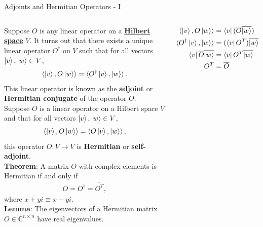 \documentclass{beamer}
\begin{document}
\begin{frame}{Adjoints and Hermitian Operators - I}
  {\tiny
    \begin{columns}
    Suppose $O$ is any linear operator on a 
    \href{https://mathworld.wolfram.com/HilbertSpace.html}{\textbf{Hilbert space}} $V$.
    It turns out that there exists a unique linear operator $O^{\dagger}$ on $V$ such that for all vectors $\ket{v}, \ket{w} \in V$,
    \begin{align*}
      \braket{\ket{v}, O\ket{w}} = \braket{O^{\dagger} \ket{v}, \ket{w}}.
    \end{align*}
    This linear operator is known as the \textbf{adjoint} or \textbf{Hermitian conjugate} of the operator $O$. \\

    \vspace{0.3cm}
    Suppose $O$ is a linear operator on a Hilbert space $V$ and that for all vectors $\ket{v}, \ket{w} \in V$,
    \begin{align*}
      \braket{\ket{v}, O\ket{w}} = \braket{O \ket{v}, \ket{w}},
    \end{align*}
    this operator $O: V \rightarrow V$ is \textbf{Hermitian} or \textbf{self-adjoint}. \\

    \vspace{0.3cm}
    \textbf{Theorem}\cite{thespectraltheoremforhermitianmatrice}: A matrix $O$ with complex elements is Hermitian if and only if \\
    \begin{align*}
      O = O^{\dagger} = \overline{O^T},
    \end{align*}
    where $\overline{x + yi} \equiv x - yi$. \\

    \vspace{0.3cm}
    \textbf{Lemma}\cite{thespectraltheoremforhermitianmatrice}: The eigenvectors of a Hermitian matrix $O \in \mathbb{C}^{n \times n}$ have real eigenvalues. \\

    \begin{block}{}
    \begin{align*}
                 \braket{\ket{v}, O\ket{w}} &= \bra{v} (\overline{O} \overline{\ket{w}}) \\
      \braket{O^{\dagger} \ket{v}, \ket{w}} &= (\bra{v} O^{T}) \overline{\ket{w}} \\
      \bra{v} \overline{O} \overline{\ket{w}} &= \bra{v} O^{T} \overline{\ket{w}} \\
      O^{T} &= \overline{O}
    \end{align*}
    \end{block}


\end{columns}}
\end{frame}
\end{document}
